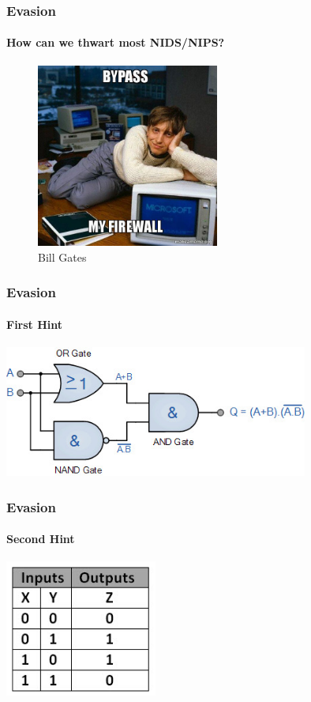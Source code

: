 \documentclass[aspectratio=169]{beamer}
\begin{document}
\begin{frame}
  \frametitle{Evasion}
  \framesubtitle{How can we thwart most NIDS/NIPS?}
  \begin{center}
    \begin{figure}
      \includegraphics[width=6cm,keepaspectratio]{bypass_firewall}
      \caption{Bill Gates}
    \end{figure}
  \end{center}
\end{frame}

\begin{frame}
  \frametitle{Evasion}
  \framesubtitle{First Hint}
  \begin{center}
    \includegraphics[width=10cm,keepaspectratio]{xor_gate}
  \end{center}
\end{frame}

\begin{frame}
  \frametitle{Evasion}
  \framesubtitle{Second Hint}
  \begin{center}
    \includegraphics[width=5cm,keepaspectratio]{xor_truth_table}
  \end{center}
\end{frame}
\end{document}
